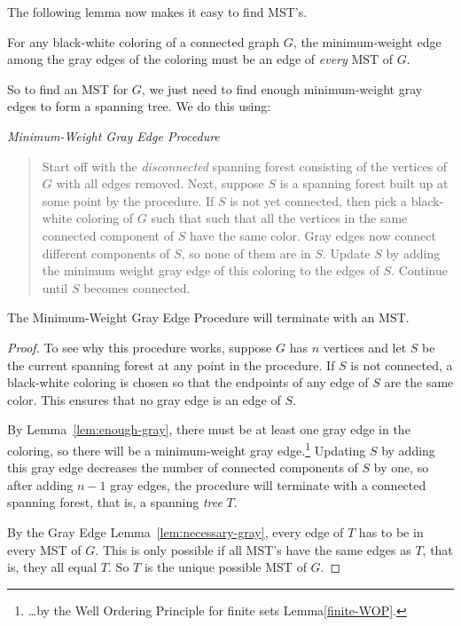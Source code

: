The following lemma now makes it easy to find MST's.

\begin{lemma}\label{lem:necessary-gray}
For any black-white coloring of a connected graph $G$, the
minimum-weight edge among the gray edges of the coloring must be an
edge of \emph{every} MST of $G$.
\end{lemma}

So to find an MST for $G$, we just need to find enough minimum-weight
gray edges to form a spanning tree.  We do this using:

\begin{center}
{\large \emph{Minimum-Weight Gray Edge Procedure}}
\end{center}

\begin{quote}
Start off with the \emph{disconnected} spanning forest consisting of
the vertices of $G$ with all edges removed.  Next, suppose $S$ is a
spanning forest built up at some point by the procedure.  If $S$ is
not yet connected, then pick a black-white coloring of $G$ such that
such that all the vertices in the same connected component of $S$ have
the same color.  Gray edges now connect different components of $S$,
so none of them are in $S$.  Update $S$ by adding the minimum weight
gray edge of this coloring to the edges of $S$.  Continue until $S$
becomes connected.
\end{quote}

\begin{theorem}
The Minimum-Weight Gray Edge Procedure will terminate with an MST.
\end{theorem}

\begin{proof}
To see why this procedure works, suppose $G$ has $n$ vertices and let
$S$ be the current spanning forest at any point in the procedure.  If
$S$ is not connected, a black-white coloring is chosen so that the
endpoints of any edge of $S$ are the same color.  This ensures that no
gray edge is an edge of $S$.

By Lemma~\ref{lem:enough-gray}, there must be at least one gray edge
in the coloring, so there will be a minimum-weight gray
edge.\footnote{\dots by the Well Ordering Principle for finite sets
  Lemma\ref{finite-WOP}.}  Updating $S$ by adding this gray edge
decreases the number of connected components of $S$ by one, so after
adding $n-1$ gray edges, the procedure will terminate with a connected
spanning forest, that is, a spanning \emph{tree} $T$.

By the Gray Edge Lemma~\ref{lem:necessary-gray}, every edge of $T$ has
to be in every MST of $G$.  This is only possible if all MST's have
the same edges as $T$, that is, they all equal $T$.  So $T$ is the
unique possible MST of $G$.
\end{proof}

